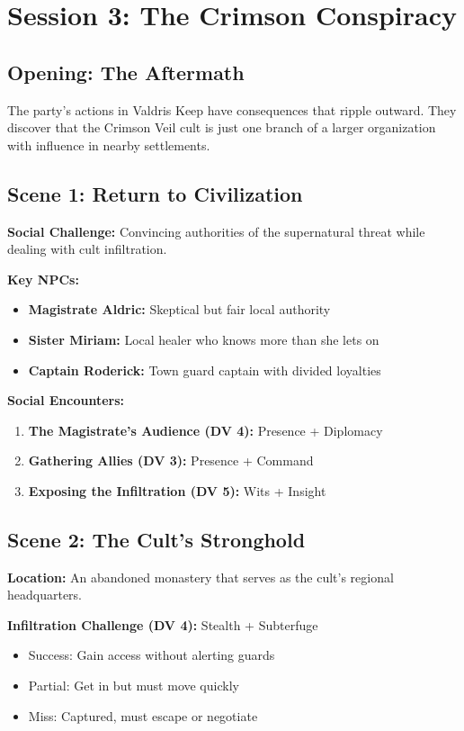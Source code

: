 \documentclass[11pt]{article}
\begin{document}
\section*{Session 3: The Crimson Conspiracy}

\subsection*{Opening: The Aftermath}
The party's actions in Valdris Keep have consequences that ripple outward. They discover that the Crimson Veil cult is just one branch of a larger organization with influence in nearby settlements.

\subsection*{Scene 1: Return to Civilization}
\textbf{Social Challenge:} Convincing authorities of the supernatural threat while dealing with cult infiltration.

\textbf{Key NPCs:}
\begin{itemize}[leftmargin=*]
\item \textbf{Magistrate Aldric:} Skeptical but fair local authority
\item \textbf{Sister Miriam:} Local healer who knows more than she lets on
\item \textbf{Captain Roderick:} Town guard captain with divided loyalties
\end{itemize}

\textbf{Social Encounters:}
\begin{enumerate}[leftmargin=*]
\item \textbf{The Magistrate's Audience (DV 4):} Presence + Diplomacy
\item \textbf{Gathering Allies (DV 3):} Presence + Command
\item \textbf{Exposing the Infiltration (DV 5):} Wits + Insight
\end{enumerate}

\subsection*{Scene 2: The Cult's Stronghold}
\textbf{Location:} An abandoned monastery that serves as the cult's regional headquarters.

\textbf{Infiltration Challenge (DV 4):} Stealth + Subterfuge
\begin{itemize}
\item Success: Gain access without alerting guards
\item Partial: Get in but must move quickly
\item Miss: Captured, must escape or negotiate
\end{itemize}
\end{document}
